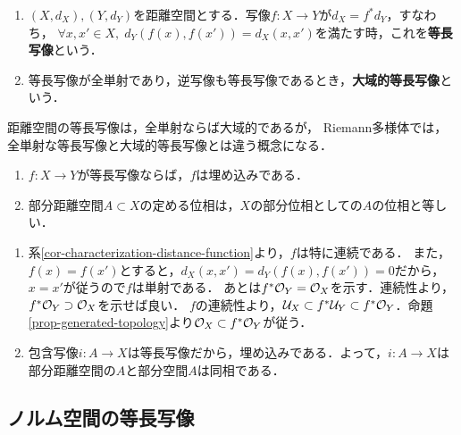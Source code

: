 \documentclass[uplatex,dvipdfmx]{jsreport}
\begin{document}
\begin{definition}\mbox{}
    \begin{enumerate}
        \item $(X,d_X),(Y,d_Y)$を距離空間とする．写像$f:X\to Y$が$d_X=f^*d_Y$，すなわち，
        $\forall x,x'\in X,\; d_Y(f(x),f(x'))=d_X(x,x')$を満たす時，これを\textbf{等長写像}という．
        \item 等長写像が全単射であり，逆写像も等長写像であるとき，\textbf{大域的等長写像}という．
    \end{enumerate}
\end{definition}
\begin{remark}
    距離空間の等長写像は，全単射ならば大域的であるが，
    Riemann多様体では，全単射な等長写像と大域的等長写像とは違う概念になる．
\end{remark}

\begin{proposition}\label{prop-部分距離空間のwell-definedness}\mbox{}
    \begin{enumerate}
        \item $f:X\to Y$が等長写像ならば，$f$は埋め込みである．
        \item 部分距離空間$A\subset X$の定める位相は，$X$の部分位相としての$A$の位相と等しい．
    \end{enumerate}
\end{proposition}
\begin{Proof}\mbox{}
    \begin{enumerate}
        \item 系\ref{cor-characterization-distance-function}より，$f$は特に連続である．
        また，$f(x)=f(x')$とすると，$d_X(x,x')=d_Y(f(x),f(x'))=0$だから，$x=x'$が従うので$f$は単射である．
        あとは$f^*\mathcal{O}_Y=\mathcal{O}_X$を示す．連続性より，$f^*\mathcal{O}_Y\supset\mathcal{O}_X$を示せば良い．
        $f$の連続性より，$\mathcal{U}_X\subset f^*\mathcal{U}_Y\subset f^*\mathcal{O}_Y$．命題\ref{prop-generated-topology}より$\mathcal{O}_X\subset f^*\mathcal{O}_Y$が従う．
        \item 包含写像$i:A\to X$は等長写像だから，埋め込みである．よって，$i:A\to X$は部分距離空間の$A$と部分空間$A$は同相である．
    \end{enumerate}
\end{Proof}

\subsection{ノルム空間の等長写像}
\end{document}
